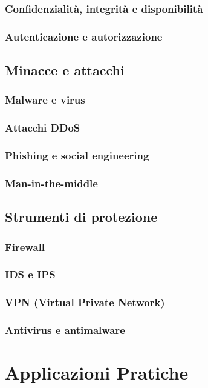 \documentclass[12pt,a4paper]{article}
\begin{document}
\subsubsection{Confidenzialità, integrità e disponibilità}
\subsubsection{Autenticazione e autorizzazione}
\subsection{Minacce e attacchi}
\subsubsection{Malware e virus}
\subsubsection{Attacchi DDoS}
\subsubsection{Phishing e social engineering}
\subsubsection{Man-in-the-middle}
\subsection{Strumenti di protezione}
\subsubsection{Firewall}
\subsubsection{IDS e IPS}
\subsubsection{VPN (Virtual Private Network)}
\subsubsection{Antivirus e antimalware}

\section{Applicazioni Pratiche}
\end{document}
